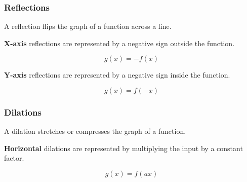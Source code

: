 \documentclass[11pt]{article}
\begin{document}
\subsubsection{Reflections}

A reflection flips the graph of a function across a line. 

\textbf{X-axis} reflections are represented by a negative sign outside the function.

\begin{equation*}
    g(x) = -f(x)
\end{equation*}

\begin{center}
\end{center}

\textbf{Y-axis} reflections are represented by a negative sign inside the function.

\begin{equation*}
    g(x) = f(-x)
\end{equation*}

\begin{center}
\end{center}

\subsubsection{Dilations}

A dilation stretches or compresses the graph of a function.

\textbf{Horizontal} dilations are represented by multiplying the input by a constant factor. 

\begin{equation*}
    g(x) = f(ax)
\end{equation*}
\end{document}
